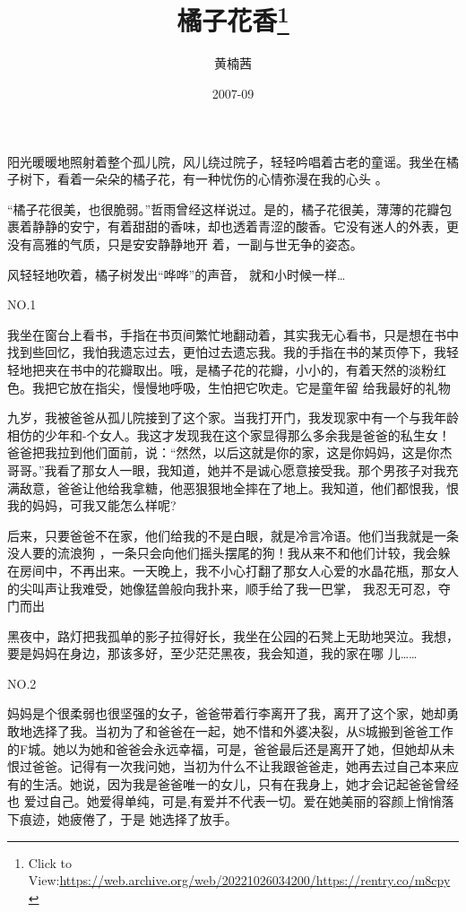 \documentclass{article}
\title{橘子花香\footnote{Click to View:\url{https://web.archive.org/web/20221026034200/https://rentry.co/m8cpy}}}
\author{黄楠茜}
\date{2007-09}
\begin{document}

\maketitle


\Large

﻿阳光暖暖地照射着整个孤儿院，风儿绕过院子，轻轻吟唱着古老的童谣。我坐在橘子树下，看着一朵朵的橘子花，有一种忧伤的心情弥漫在我的心头
。 

“橘子花很美，也很脆弱。”哲雨曾经这样说过。是的，橘子花很美，薄薄的花瓣包裹着静静的安宁，有着甜甜的香味，却也透着青涩的酸香。它没有迷人的外表，更没有高雅的气质，只是安安静静地开
着，一副与世无争的姿态。 

风轻轻地吹着，橘子树发出“哗哗”的声音，
就和小时候一样… 


\newpage

NO.1 

我坐在窗台上看书，手指在书页间繁忙地翻动着，其实我无心看书，只是想在书中找到些回忆，我怕我遗忘过去，更怕过去遗忘我。我的手指在书的某页停下，我轻轻地把夹在书中的花瓣取出。哦，是橘子花的花瓣，小小的，有着天然的淡粉红色。我把它放在指尖，慢慢地呼吸，生怕把它吹走。它是童年留
给我最好的礼物 

九岁，我被爸爸从孤儿院接到了这个家。当我打开门，我发现家中有一个与我年龄相仿的少年和-个女人。我这才发现我在这个家显得那么多余我是爸爸的私生女！爸爸把我拉到他们面前，说：“然然，以后这就是你的家，这是你妈妈，这是你杰哥哥。”我看了那女人一眼，我知道，她并不是诚心愿意接受我。那个男孩子对我充满敌意，爸爸让他给我拿糖，他恶狠狠地全摔在了地上。我知道，他们都恨我，恨
我的妈妈，可我又能怎么样呢? 

后来，只要爸爸不在家，他们给我的不是白眼，就是冷言冷语。他们当我就是一条没人要的流浪狗
\newpage
，一条只会向他们摇头摆尾的狗！我从来不和他们计较，我会躲在房间中，不再出来。一天晚上，我不小心打翻了那女人心爱的水晶花瓶，那女人的尖叫声让我难受，她像猛兽般向我扑来，顺手给了我一巴掌，
我忍无可忍，夺门而出 

黑夜中，路灯把我孤单的影子拉得好长，我坐在公园的石凳上无助地哭泣。我想，要是妈妈在身边，那该多好，至少茫茫黑夜，我会知道，我的家在哪
儿…… 


NO.2 

妈妈是个很柔弱也很坚强的女子，爸爸带着行李离开了我，离开了这个家，她却勇敢地选择了我。当初为了和爸爸在一起，她不惜和外婆决裂，从S城搬到爸爸工作的F城。她以为她和爸爸会永远幸福，可是，爸爸最后还是离开了她，但她却从未恨过爸爸。记得有一次我问她，当初为什么不让我跟爸爸走，她再去过自己本来应有的生活。她说，因为我是爸爸唯一的女儿，只有在我身上，她才会记起爸爸曾经也
\newpage
爱过自己。她爱得单纯，可是,有爱并不代表一切。爱在她美丽的容颜上悄悄落下痕迹，她疲倦了，于是
她选择了放手。 
\end{document}
